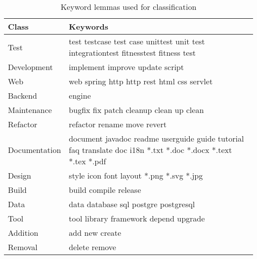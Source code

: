 \begin{table}[]
   \centering
   \caption{Keyword lemmas used for classification}
   \label{tab:keywords}
   \begin{tabular}{@{}m{}m{}@{}}
      \toprule
      \textbf{Class} & \textbf{Keywords}                                                                                               \\ \midrule
      Test           & test testcase test case unittest unit test integrationtest fitnesstest fitness test                                     \\
      Development    & implement improve update script                                                                                 \\
      Web            & web spring http http rest html css servlet                                                                      \\
      Backend        & engine                                                                                                          \\
      Maintenance    & bugfix fix patch cleanup clean up clean                                                                         \\
      Refactor       & refactor rename move revert                                                                                     \\
      Documentation  & document javadoc readme userguide guide tutorial faq translate doc i18n *.txt *.doc *.docx *.text *.tex *.pdf \\
      Design         & style icon font layout *.png *.svg *.jpg                                                                        \\
      Build          & build compile release                                                                                           \\
      Data           & data database sql postgre postgresql                                                                            \\
      Tool           & tool library framework depend upgrade                                                                           \\
      Addition       & add new create                                                                                                  \\
      Removal        & delete remove                                                                                                   \\

\end{tabular}
\end{table}
